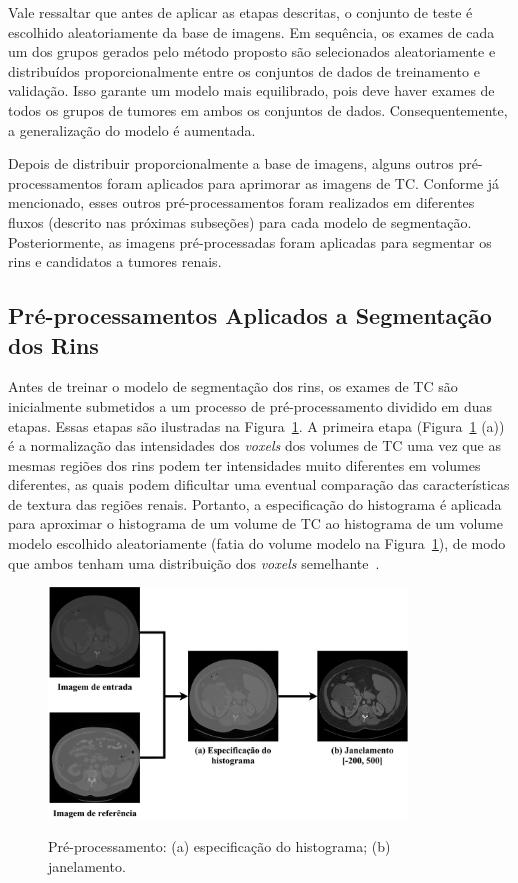 Vale ressaltar que antes de aplicar as etapas descritas, o conjunto de teste é escolhido aleatoriamente da base de imagens. Em sequência, os exames de cada um dos grupos gerados pelo método proposto são selecionados aleatoriamente e distribuídos proporcionalmente entre os conjuntos de dados de treinamento e validação. Isso garante um modelo mais equilibrado, pois deve haver exames de todos os grupos de tumores em ambos os conjuntos de dados. Consequentemente, a generalização do modelo é aumentada.

Depois de distribuir proporcionalmente a base de imagens, alguns outros pré-processamentos foram aplicados para aprimorar as imagens de TC. Conforme já mencionado, esses outros pré-processamentos foram realizados em diferentes fluxos (descrito nas próximas subseções) para cada modelo de segmentação. Posteriormente, as imagens pré-processadas foram aplicadas para segmentar os rins e candidatos a tumores renais.

\subsection{Pré-processamentos Aplicados a Segmentação dos Rins}
\label{sec:pre-processamento-SR}

Antes de treinar o modelo de segmentação dos rins, os exames de TC são inicialmente submetidos a um processo de pré-processamento dividido em duas etapas. Essas etapas são ilustradas na Figura~\ref{fig:especificacao-janelamento}. A primeira etapa (Figura~\ref{fig:especificacao-janelamento} (a)) é a normalização das intensidades dos \textit{voxels} dos volumes de TC uma vez que as mesmas regiões dos rins podem ter intensidades muito diferentes em volumes diferentes, as quais podem dificultar uma eventual comparação das características de textura das regiões renais. Portanto, a especificação do histograma é aplicada para aproximar o histograma de um volume de TC ao histograma de um volume modelo escolhido aleatoriamente (fatia do volume modelo na Figura~\ref{fig:especificacao-janelamento}), de modo que ambos tenham uma distribuição dos \textit{voxels} semelhante~\cite{gonzalez2008digital}.

\begin{figure}[!ht]
    \centering
    \caption{Pré-processamento: (a) especificação do histograma; (b) janelamento.}
    \includegraphics[width=0.85\textwidth]{figuras/especificacao-janelamento.pdf}
    \label{fig:especificacao-janelamento}
\end{figure}

